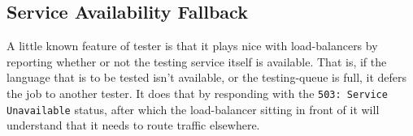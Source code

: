\subsection{Service Availability Fallback}
A little known feature of tester is that it plays nice with load-balancers by reporting whether or not the testing service itself is available. That is, if the language that is to be tested isn't available, or the testing-queue is full, it defers the job to another tester. It does that by responding with the \texttt{503: Service Unavailable} status, after which the load-balancer sitting in front of it will understand that it needs to route traffic elsewhere.

